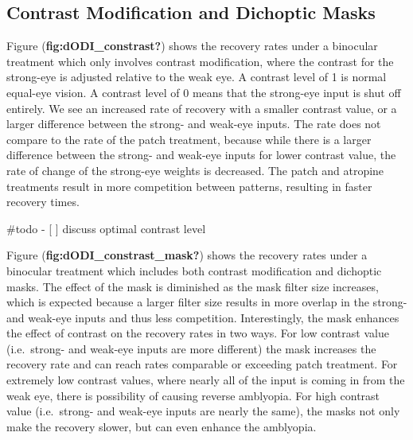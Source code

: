 \documentclass[
  letterpaper,
  DIV=11,
  numbers=noendperiod]{scrreprt}
\begin{document}
\hypertarget{contrast-modification-and-dichoptic-masks}{%
\section*{Contrast Modification and Dichoptic
Masks}\label{contrast-modification-and-dichoptic-masks}}

Figure (\textbf{fig:dODI\_constrast?}) shows the recovery rates under a
binocular treatment which only involves contrast modification, where the
contrast for the strong-eye is adjusted relative to the weak eye. A
contrast level of 1 is normal equal-eye vision. A contrast level of 0
means that the strong-eye input is shut off entirely. We see an
increased rate of recovery with a smaller contrast value, or a larger
difference between the strong- and weak-eye inputs. The rate does not
compare to the rate of the patch treatment, because while there is a
larger difference between the strong- and weak-eye inputs for lower
contrast value, the rate of change of the strong-eye weights is
decreased. The patch and atropine treatments result in more competition
between patterns, resulting in faster recovery times.

\#todo - {[} {]} discuss optimal contrast level

Figure (\textbf{fig:dODI\_constrast\_mask?}) shows the recovery rates
under a binocular treatment which includes both contrast modification
and dichoptic masks. The effect of the mask is diminished as the mask
filter size increases, which is expected because a larger filter size
results in more overlap in the strong- and weak-eye inputs and thus less
competition. Interestingly, the mask enhances the effect of contrast on
the recovery rates in two ways. For low contrast value (i.e.~strong- and
weak-eye inputs are more different) the mask increases the recovery rate
and can reach rates comparable or exceeding patch treatment. For
extremely low contrast values, where nearly all of the input is coming
in from the weak eye, there is possibility of causing reverse amblyopia.
For high contrast value (i.e.~strong- and weak-eye inputs are nearly the
same), the masks not only make the recovery slower, but can even enhance
the amblyopia.

\hypertarget{section}{%
\chapter{}\label{section}}
\end{document}
